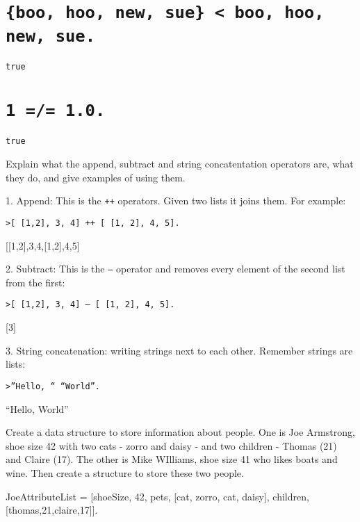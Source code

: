\begin{questions}
\begin{parts}
        \part[1] {\tt \{boo, hoo, new, sue\} < {boo, hoo, new, sue}. }
        \begin{solution}
            {\tt true}
        \end{solution}
        \part[1] {\tt 1 =/= 1.0.}
        \begin{solution}
            {\tt true}
        \end{solution}
    \end{parts}

    \question[10] Explain what the append, subtract and string
    concatentation operators are, what they do, and give examples of
    using them.
    \begin{solution}
        1. Append: This is the {\tt ++} operators. Given two lists it
           joins them. For example:

           {\tt >[ [1,2], 3, 4] ++ [ [1, 2], 4, 5].

                 [[1,2],3,4,[1,2],4,5] }

       2. Subtract: This is the {\tt --} operator and removes every
          element of the second list from the first:

          {\tt >[ [1,2], 3, 4] -- [ [1, 2], 4, 5].

               [3] }

       3. String concatenation: writing strings next to each
          other. Remember strings are lists:

          {\tt >''Hello, `` ``World''.
              
               ``Hello, World'' }
    \end{solution}

    \question[8] Create a data structure to store information about
    people. One is Joe Armstrong, shoe size 42 with two cats - zorro
    and daisy - and two children - Thomas (21) and Claire (17). The
    other is Mike WIlliams, shoe size 41 who likes boats and
    wine. Then create a structure to store these two people.

    \begin{solution}
    {\tt

    JoeAttributeList = [{shoeSize, 42}, {pets, [{cat, zorro},
    {cat, daisy}]}, {children, [{thomas,21},{claire,17}]}].

}
\end{solution}
\end{questions}
